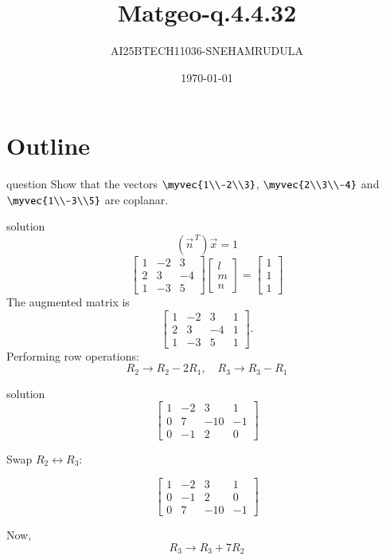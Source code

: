 \documentclass{beamer}
\title{Matgeo-q.4.4.32}
\author{AI25BTECH11036-SNEHAMRUDULA}
\date{\today}
\begin{document}
\begin{frame}
\titlepage
\end{frame}

\section*{Outline}
\begin{frame}{question}
    Show that the vectors 
$\myvec{1\\-2\\3}$,\;
$\myvec{2\\3\\-4}$ and 
$\myvec{1\\-3\\5}$ are coplanar.

\end{frame}
\begin{frame}{solution}
\[
\left(\vec{n}^{\,T}\right)\vec{x} = 1
\]
\[
\begin{bmatrix}
1 & -2 & 3 \\
2 & 3 & -4 \\
1 & -3 & 5
\end{bmatrix}
\begin{bmatrix}
l \\ m \\ n
\end{bmatrix}
=
\begin{bmatrix}
1 \\ 1 \\ 1
\end{bmatrix}
\]
The augmented matrix is
\[
\left[
\begin{array}{ccc|c}
1 & -2 & 3 & 1 \\
2 & 3 & -4 & 1 \\
1 & -3 & 5 & 1
\end{array}
\right].
\]
Performing row operations:
\[
R_2 \to R_2 - 2R_1,\quad 
R_3 \to R_3 - R_1
\]
\end{frame}
\begin{frame}{solution}
\[
\left[
\begin{array}{ccc|c}
1 & -2 & 3 & 1 \\
0 & 7 & -10 & -1 \\
0 & -1 & 2 & 0
\end{array}
\right]
\]

Swap \(R_2 \leftrightarrow R_3\):

\[
\left[
\begin{array}{ccc|c}
1 & -2 & 3 & 1 \\
0 & -1 & 2 & 0 \\
0 & 7 & -10 & -1
\end{array}
\right]
\]

Now,
\[
R_3 \to R_3 + 7R_2
\]
\end{frame}
\end{document}
